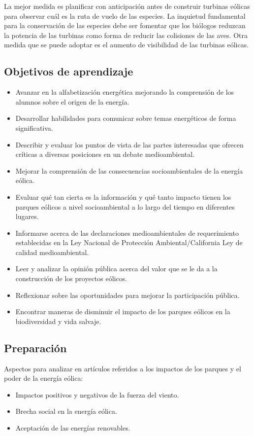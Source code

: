 \documentclass{article}
\begin{document}
La mejor medida es planificar con anticipación antes de construir turbinas eólicas para observar cuál es la ruta de vuelo de las especies. La inquietud fundamental para la conservación de las especies debe ser fomentar que los biólogos reduzcan la potencia de las turbinas como forma de reducir las colisiones de las aves. Otra medida que se puede adoptar es el aumento de visibilidad de las turbinas eólicas.


\subsection{Objetivos de aprendizaje}
\begin{itemize}
    \item Avanzar en la alfabetización energética mejorando la comprensión de los alumnos sobre el origen de la energía.
    \item Desarrollar habilidades para comunicar
sobre temas energéticos de forma significativa.
\item Describir y evaluar los puntos de vista de las partes interesadas que ofrecen críticas a diversas posiciones en un debate medioambiental.
\item  Mejorar la comprensión de las consecuencias socioambientales de la energía eólica.
\item Evaluar qué tan cierta es la información y qué tanto impacto tienen los parques eólicos a nivel socioambiental a lo largo del tiempo en diferentes lugares.
\item Informarse acerca de las declaraciones medioambientales de requerimiento establecidas en la Ley Nacional de Protección Ambiental/California Ley de calidad medioambiental.
\item Leer y analizar la opinión pública acerca del valor que se le da a la construcción de los proyectos eólicos.
\item Reflexionar sobre las oportunidades para mejorar la participación pública.
\item Encontrar maneras de disminuir el impacto de los parques eólicos en la biodiversidad y vida salvaje.

\end{itemize}

\subsection{Preparación}
Aspectos para analizar en artículos referidos a los impactos de los parques y el poder de la energía eólica: 
\begin{itemize}
\item Impactos positivos y negativos de la fuerza del viento.
\item Brecha social en la energía eólica.
\item Aceptación de las energías renovables.
\end{itemize}
\end{document}
